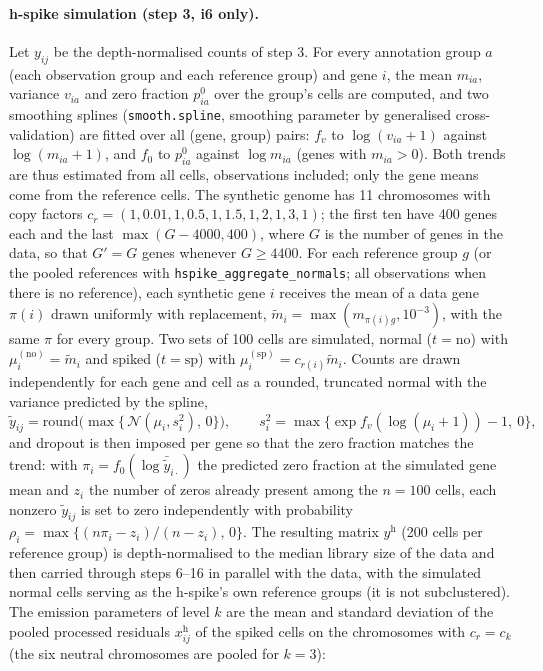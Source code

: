 \paragraph{h-spike simulation (step 3, i6 only).}
Let $y_{ij}$ be the depth-normalised counts of step 3. For every annotation group $a$ (each observation group and each reference group) and gene $i$, the mean $m_{ia}$, variance $v_{ia}$ and zero fraction $p^0_{ia}$ over the group's cells are computed, and two smoothing splines (\texttt{smooth.spline}, smoothing parameter by generalised cross-validation) are fitted over all (gene, group) pairs: $f_v$ to $\log(v_{ia}+1)$ against $\log(m_{ia}+1)$, and $f_0$ to $p^0_{ia}$ against $\log m_{ia}$ (genes with $m_{ia}>0$). Both trends are thus estimated from all cells, observations included; only the gene means come from the reference cells. The synthetic genome has 11 chromosomes with copy factors $c_r = (1, 0.01, 1, 0.5, 1, 1.5, 1, 2, 1, 3, 1)$; the first ten have 400 genes each and the last $\max(G-4000, 400)$, where $G$ is the number of genes in the data, so that $G'=G$ genes whenever $G\geq 4400$. For each reference group $g$ (or the pooled references with \texttt{hspike\_aggregate\_normals}; all observations when there is no reference), each synthetic gene $i$ receives the mean of a data gene $\pi(i)$ drawn uniformly with replacement, $\tilde m_i = \max(m_{\pi(i) g}, 10^{-3})$, with the same $\pi$ for every group. Two sets of 100 cells are simulated, normal ($t=\mathrm{no}$) with $\mu^{(\mathrm{no})}_i=\tilde m_i$ and spiked ($t=\mathrm{sp}$) with $\mu^{(\mathrm{sp})}_i = c_{r(i)}\tilde m_i$. Counts are drawn independently for each gene and cell as a rounded, truncated normal with the variance predicted by the spline,
\begin{equation}
\tilde y_{ij} = \mathrm{round}\big(\max\{\,\mathcal N(\mu_i, s_i^2),\,0\}\big),\qquad
s_i^2 = \max\{\exp f_v(\log(\mu_i+1)) - 1,\ 0\},
\end{equation}
and dropout is then imposed per gene so that the zero fraction matches the trend: with $\pi_i = f_0(\log \bar{\tilde y}_{i\cdot})$ the predicted zero fraction at the simulated gene mean and $z_i$ the number of zeros already present among the $n=100$ cells, each nonzero $\tilde y_{ij}$ is set to zero independently with probability $\rho_i = \max\{(n\pi_i - z_i)/(n - z_i),\,0\}$. The resulting matrix $y^{\mathrm h}$ (200 cells per reference group) is depth-normalised to the median library size of the data and then carried through steps 6--16 in parallel with the data, with the simulated normal cells serving as the h-spike's own reference groups (it is not subclustered). The emission parameters of level $k$ are the mean and standard deviation of the pooled processed residuals $x^{\mathrm h}_{ij}$ of the spiked cells on the chromosomes with $c_r=c_k$ (the six neutral chromosomes are pooled for $k=3$):

